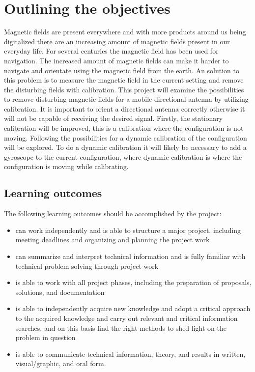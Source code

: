 \chapter{Outlining the objectives}

Magnetic fields are present everywhere and with more products around us being digitalized there are an increasing amount of magnetic fields present in our everyday life. For several centuries the magnetic field has been used for navigation. The increased amount of magnetic fields can make it harder to navigate and orientate using the magnetic field from the earth. An solution to this problem is to measure the magnetic field in the current setting and remove the disturbing  fields with calibration. This project will examine the possibilities to remove disturbing magnetic fields for a mobile directional antenna by utilizing calibration. It is important to orient a directional antenna correctly otherwise it will not be capable of receiving the desired signal. Firstly, the stationary calibration will be improved, this is a calibration where the configuration is not moving. Following the possibilities for a dynamic calibration of the configuration will be explored. To do a dynamic calibration it will likely be necessary to add a gyroscope to the current configuration, where dynamic calibration is where the configuration is moving while calibrating.

\section{Learning outcomes}
The following learning outcomes should be accomplished by the project:
\begin{itemize}
	\item can work independently and is able to structure a major project, including meeting deadlines and organizing and planning the project work
	\item can summarize and interpret technical information and is fully familiar with technical problem solving through project work
	\item is able to work with all project phases, including the preparation of proposals, solutions, and documentation
	\item is able to independently acquire new knowledge and adopt a critical approach to the acquired knowledge and carry out relevant and critical information searches, and on this basis find the right methods to shed light on the problem in question
	\item is able to communicate technical information, theory, and results in written, visual/graphic, and oral form.
\end{itemize}

